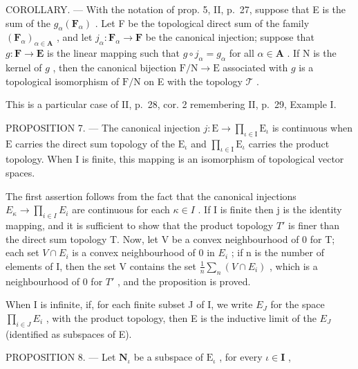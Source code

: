 COROLLARY. --- With the notation of prop. 5, II, p.~27, suppose that E is the sum of the \(g_{\alpha}(\mathbf{F}_{\alpha})\) . Let F be the topological direct sum of the family \((\mathbf{F}_{\alpha})_{\alpha \in \mathbf{A}}\) , and let \(j_{\alpha}: \mathbf{F}_{\alpha} \to \mathbf{F}\) be the canonical injection; suppose that \(g: \mathbf{F} \to \mathbf{E}\) is the linear mapping such that \(g \circ j_{\alpha} = g_{\alpha}\) for all \(\alpha \in \mathbf{A}\) . If N is the kernel of \(g\) , then the canonical bijection \(\mathrm{F/N} \to \mathrm{E}\) associated with \(g\) is a topological isomorphism of \(\mathrm{F/N}\) on E with the topology \(\mathcal{T}\) .

This is a particular case of II, p.~28, cor. 2 remembering II, p.~29, Example I.

PROPOSITION 7. --- The canonical injection \(j: \mathrm{E} \to \prod_{\iota \in \mathrm{I}} \mathrm{E}_{\iota}\) is continuous when \(\mathrm{E}\) carries the direct sum topology of the \(\mathrm{E}_{\iota}\) and \(\prod_{\iota \in \mathrm{I}} \mathrm{E}_{\iota}\) carries the product topology. When \(\mathrm{I}\) is finite, this mapping is an isomorphism of topological vector spaces.

The first assertion follows from the fact that the canonical injections \(E_{\kappa} \to \prod_{i \in I} E_{i}\) are continuous for each \(\kappa \in I\) . If I is finite then j is the identity mapping, and it is sufficient to show that the product topology \(T'\) is finer than the direct sum topology T. Now, let V be a convex neighbourhood of 0 for T; each set \(V \cap E_{i}\) is a convex neighbourhood of 0 in \(E_{i}\) ; if n is the number of elements of I, then the set V contains the set \(\frac{1}{n} \sum_{n} (V \cap E_{i})\) , which is a neighbourhood of 0 for \(T'\) , and the proposition is proved.

When I is infinite, if, for each finite subset J of I, we write \(E_{J}\) for the space \(\prod_{i\in J}E_{i}\) , with the product topology, then E is the inductive limit of the \(E_{J}\) (identified as subspaces of E).

PROPOSITION 8. --- Let \(\mathbf{N}_{\iota}\) be a subspace of \(\mathrm{E}_{\iota}\) , for every \(\iota \in \mathbf{I}\) ,

